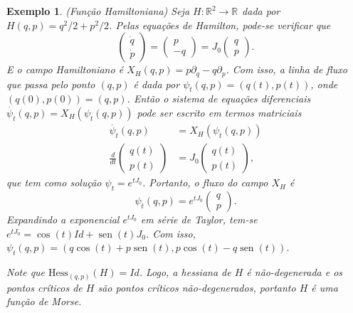 \documentclass[12pt]{book}
\newtheorem{exemplo}[teorema]{Exemplo}
\DeclareMathOperator{\sen}{sen}
\newcommand{\campohamiltoniano}[1]{X_{H}(#1)}
\newcommand{\campohamiltonianoabrev}{X_{H}}
\newcommand{\derivada}[2]{\frac{d #1}{d #2}}
\newcommand{\estruturacomplexa}{J_{0}}
\newcommand{\hessianaponto}[2]{\text{Hess}_{#1}(#2)}
\newcommand{\real}[1]{\mathbb{R}^{#1}}
\newcommand{\reta}{\real{}}
\begin{document}
	\begin{exemplo}\label{exemplo_funcao_hamiltoniana}
		(Função Hamiltoniana) Seja $H:\real{2} \to \reta$ dada por $H(q,p) = q^{2}/2+p^{2}/2$. Pelas equações de Hamilton, pode-se verificar que 
		$$
			\left(
			\begin{array}{c}
			\dot{q}
			\\
			\dot{p}
			\end{array}
			\right) = 
			\left(
			\begin{array}{c}
			p
			\\
			-q
			\end{array}
			\right)
			=\estruturacomplexa
			\left(
			\begin{array}{c}
			q
			\\
			p
			\end{array}
			\right).
		$$
		E o campo Hamiltoniano é $\campohamiltoniano{q,p} = p\partial_{q}-q\partial_{p}$. Com isso, a linha de fluxo que passa pelo ponto $(q,p)$ é dada por $\psi_{t}(q,p) = (q(t), p(t))$, onde $(q(0), p(0)) = (q, p)$. Então o sistema de equações diferenciais $\dot{\psi_{t}}(q,p) = \campohamiltoniano{\psi_{t}(q,p)}$ pode ser escrito em termos matriciais
		$$
		\begin{aligned}
		\dot{\psi_{t}}(q,p) &=  \campohamiltoniano{\psi_{t}(q,p)}
		\\
		\derivada{}{t}\left(
		\begin{array}{c}
		q(t)
		\\
		p(t)
		\end{array}
		\right)
		&=
		\estruturacomplexa
		\left(
		\begin{array}{c}
		q(t)
		\\
		p(t)
		\end{array}
		\right),
		\end{aligned}
		$$ 
		que tem como solução $\psi_{t}=e^{t\estruturacomplexa}$. Portanto, o fluxo do campo $\campohamiltonianoabrev$ é
		$$
		\psi_{t}(q,p) = e^{t\estruturacomplexa}
		\left(
		\begin{array}{c}
		q
		\\
		p
		\end{array}
		\right).
		$$
		Expandindo a exponencial $e^{t\estruturacomplexa}$ em série de Taylor, tem-se $e^{t\estruturacomplexa}=\cos(t)Id+\sen(t)\estruturacomplexa$. Com isso, $		\psi_{t}(q,p)=(q\cos(t)+p\sen(t), p\cos(t)-q\sen(t))$.
		
		Note que $\hessianaponto{(q,p)}{H} = Id$. Logo, a hessiana de $H$ é não-degenerada e os pontos críticos de $H$ são pontos críticos não-degenerados, portanto $H$ é uma função de Morse.
		

\end{exemplo}
\end{document}
